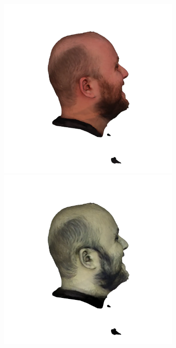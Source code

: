 \begin{figure}
\begin{subfigure}{0.18\linewidth}
	\end{subfigure}
    \begin{subfigure}{0.18\linewidth}
        \includegraphics[width=\textwidth]{Figures/failed/stross/3d/snapshot15.png}
        \includegraphics[width=\textwidth]{Figures/failed/stross/3d/snapshot16.png}

\end{subfigure}
\end{figure}
